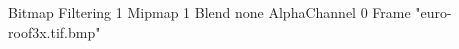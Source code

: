 {Bitmap
	{Filtering 1}
	{Mipmap 1}
	{Blend none}
	{AlphaChannel 0}
	{Frame "euro-roof3x.tif.bmp"}
}
